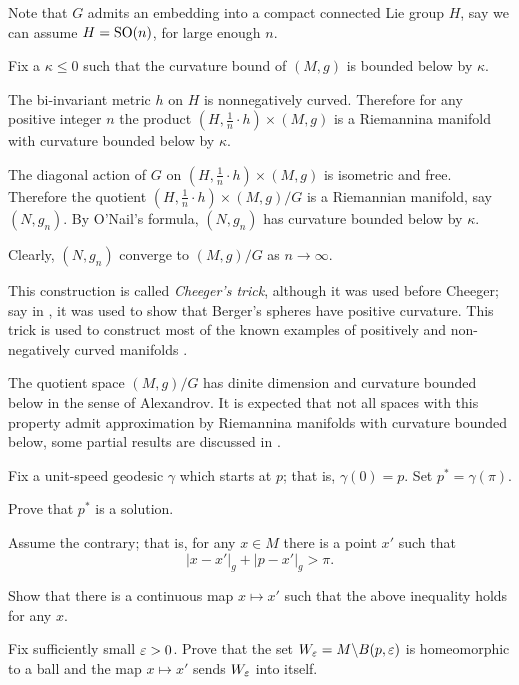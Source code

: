 Note that $G$ admits an embedding into a compact connected Lie group $H$, say we can assume $H=\mathrm{SO}(n)$, for large enough $n$.

Fix a $\kappa\le 0$ such that the curvature bound of $(M,g)$ is bounded below by $\kappa$.

The bi-invariant metric $h$ on $H$ is nonnegatively curved.
Therefore for any positive integer $n$ the product $(H,\tfrac1n\cdot h)\times (M,g)$ is a Riemannina manifold with  curvature bounded below by $\kappa$.

The diagonal action of $G$ on $(H,\tfrac1n\cdot h)\times (M,g)$ is        isometric and free. 
Therefore 
the quotient $(H,\tfrac1n\cdot h)\times (M,g)/G$
is a Riemannian manifold, say $(N,g_n)$.
By O'Nail's formula, $(N,g_n)$ has curvature bounded below by $\kappa$.

Clearly, $(N,g_n)$ converge to $(M,g)/G$ as $n\to \infty$.\qeds

This construction is called \emph{Cheeger's trick},
although it was used before Cheeger;
say in \cite{GKM}, it was used to show that Berger's spheres have positive curvature.
This trick is used to construct most of the known examples of positively and non-negatively curved manifolds
 \cite[see][]{cheeger,aloff-wallach,gromoll-meyer,eschenburg-spaces,bazajkin}.
 
The quotient space  $(M,g)/G$ has dinite dimension and curvature bounded below in the sense of Alexandrov. 
It is expected that not all spaces with this property admit approximation by Riemannina manifolds with curvature bounded below,
some partial results are discussed in \cite{pwz,kapovitch}.








Fix a unit-speed geodesic $\gamma$ which starts at $p$;
that is, $\gamma(0)=p$.
Set $p^*=\gamma(\pi)$.

Prove that $p^*$ is a solution.\qeds

Assume the contrary;
that is, for any $x\in M$ there is a point $x'$ such that 
\[|x-x'|_g+|p-x'|_g>\pi.\]

Show that there is a continuous map $x\mapsto x'$
such that the above inequality holds for any $x$.

Fix sufficiently small $\varepsilon>0$.
Prove that the set $W_\varepsilon=M\backslash B(p,\varepsilon)$ 
is homeomorphic to a ball 
and the map $x\mapsto x'$ sends $W_\varepsilon$ into itself.

